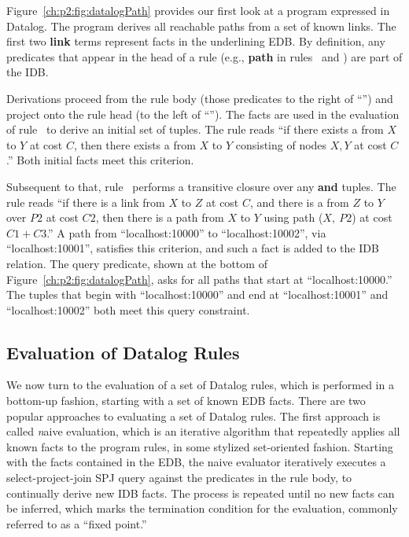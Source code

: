 Figure~\ref{ch:p2:fig:datalogPath} provides our first look at a program
expressed in Datalog.  The program derives all reachable paths from a set of
known links.  The first two {\bf link} terms represent facts in the underlining
EDB.  By definition, any predicates that appear in the head of a rule (e.g.,
{\bf path} in rules~ and ) are part of the IDB.

Derivations proceed from the rule body (those predicates to the right of
``\ol{:-}'') and project onto the rule head (to the left of ``\ol{:-}'').  The
 facts are used in the evaluation of rule~ to derive an initial
set of  tuples.  The rule reads ``if there exists a  from $X$
to $Y$ at cost $C$, then there exists a  from $X$ to $Y$ consisting of
nodes $X, Y$ at cost $C$.'' Both initial facts meet this criterion.

Subsequent to that, rule~ performs a transitive closure over any
 {\bf and}  tuples.  The rule reads ``if there is a link from
$X$ to $Z$ at cost $C$, and there is a  from $Z$ to $Y$ over $P2$ at
cost $C2$, then there is a path from $X$ to $Y$ using path ($X,\ P2$) at cost
$C1+C3$.'' A path from ``localhost:10000'' to ``localhost:10002'', via
``localhost:10001'', satisfies this criterion, and such a fact is added to the
 IDB relation.  The query predicate, shown at the bottom
of Figure~\ref{ch:p2:fig:datalogPath}, asks for all paths that start at
``localhost:10000.'' The  tuples that begin with ``localhost:10000'' and
end at ``localhost:10001'' and ``localhost:10002'' both meet this query constraint.

\subsection{Evaluation of Datalog Rules}

We now turn to the evaluation of a set of Datalog rules, which is performed in
a bottom-up fashion, starting with a set of known EDB facts.  There are two
popular approaches to evaluating a set of Datalog rules.  The first approach is
called {\emph naive evaluation}, which is an iterative algorithm that
repeatedly applies all known facts to the program rules, in some stylized
set-oriented fashion.  Starting with the facts contained in the EDB, the naive
evaluator iteratively executes a select-project-join SPJ query against the
predicates in the rule body, to continually derive new IDB facts.  The process
is repeated until no new facts can be inferred, which marks the termination
condition for the evaluation, commonly referred to as a ``fixed point.''

